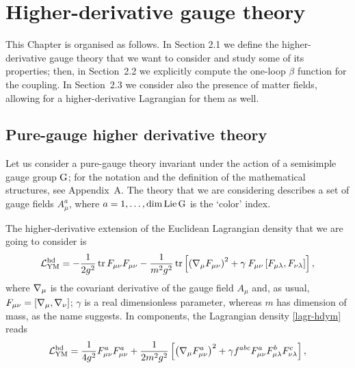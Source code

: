 
\chapter{Higher-derivative gauge theory}

This Chapter is organised as follows. In Section 2.1 we define the higher-derivative gauge theory that we want to consider and study some of its properties; then, in Section~2.2 we explicitly compute the one-loop $\beta$ function for the \ym{} coupling. In Section~2.3 we consider also the presence of matter fields, allowing for a higher-derivative Lagrangian for them as well.






\section{Pure-gauge higher derivative theory}

Let us consider a pure-gauge theory invariant under the action of a semisimple gauge group ${ \text{G} }$; for the notation and the definition of the mathematical structures, see Appendix~A. The theory that we are considering describes a set of gauge fields $A_\mu^a$, where $a=1,\ldots,\dim\mathrm{Lie}\, { \text{G} }$ is the `color' index.


The higher-derivative extension of the \ym{} Euclidean Lagrangian density that we are going to consider is
\begin{equation}\label{lagr-hdym}
\Lagr^\HD_{\YM}
	=
- \frac{1}{2 g^2} \tr  F_{\mu\nu} F_{\mu\nu} %
	- \frac{1}{ m^2 g^2 }\tr
		\left[
			 \left( \covD_\mu F_{\mu\nu} \right)^2
			+ \gamma   \: F_{\mu\nu}
				\left[ F_{\mu\lambda},
				F_{\nu\lambda} \right] 
			\right],
\end{equation}
where ${ \mathcal{\nabla} }_\mu$ is the covariant derivative of the gauge field $A_\mu$ and, as usual,
\(
F_{\mu\nu} 
	=
[{ \mathcal{\nabla} }_\mu, { \mathcal{\nabla} }_\nu] 
\); $ \gamma$ is a real dimensionless parameter, whereas $m$ has dimension of mass, as the name suggests. 
In components, the Lagrangian density \eqref{lagr-hdym} reads
\begin{equation}\label{lagr-hdym-comp}
{ \mathcal{L} }^{ \text{hd} }_{{ \text{YM} }}
	=
\frac{1}{4 g^2}  F^a_{\mu\nu} F^a_{\mu\nu}
	+ \frac{1}{ 2 m^2 g^2 }
		\left[
			 \left( { \mathcal{\nabla} }_\mu F^a_{\mu\nu} \right)^2
			+ \gamma  f^{abc}  F^a_{\mu\nu}
				F^b_{\mu\lambda}
				F^c_{\nu\lambda}  
			\right],
\end{equation}




